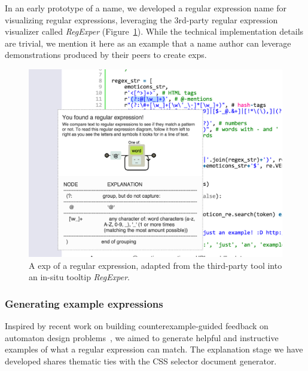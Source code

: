 In an early prototype of a \gls{name}, we developed a regular expression \gls{name} for visualizing regular expressions, leveraging the 3rd-party regular expression visualizer called \emph{RegExper} (Figure~\ref{fig:regex_visualization}).
While the technical implementation details are trivial, we mention it here as an example that a \gls{name} author can leverage demonstrations produced by their peers to create \glspl{exp}.

\begin{figure}
\centering
\includegraphics[width=\columnwidth]{figures/explain_on_select}
\caption{A \gls{exp} of a regular expression, adapted from the third-party tool into an in-situ tooltip \emph{RegExper}.}
\label{fig:regex_visualization}
\end{figure}

\subsubsection{Generating example expressions}

Inspired by recent work on building counterexample-guided feedback on automaton design problems~\cite{dantoni_how_2015}, we aimed to generate helpful and instructive examples of what a regular expression can match.
The explanation stage we have developed shares thematic ties with the CSS selector document generator. 
\fi

